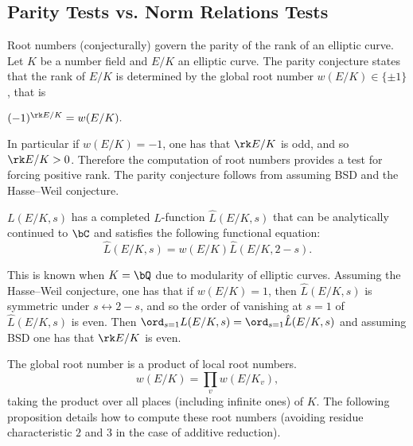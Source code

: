 \subsection{Parity Tests vs. Norm Relations Tests}\label{sec_tests}
Root numbers (conjecturally) govern the parity of the rank of an elliptic curve. Let $K$ be a number field and $E / K$ an elliptic curve. The parity conjecture states that the rank of $E / K$ is determined by the global root number $w(E / K) \in \{ \pm 1 \}$, that is

\begin{conj}\label{parity}
    $(-1)^{\rk E / K} = w(E / K).$
\end{conj}

In particular if $w(E / K) = -1$, one has that $\rk E / K$ is odd, and so $\rk E / K > 0$. Therefore the computation of root numbers provides a test for forcing positive rank. The parity conjecture follows from assuming BSD and the Hasse--Weil conjecture. 

\begin{conj}\label{conj_hasseweil}
    $L(E / K, s)$ has a completed $L$-function 
    $\hat{L}(E / K, s)$ that can be analytically continued to $\bC$ and satisfies the following functional equation:
    \[ \hat{L}(E / K, s) = w(E / K) \hat{L}(E / K, 2- s) .\]
\end{conj}

This is known when $K = \bQ$ due to modularity of elliptic curves. Assuming the Hasse--Weil conjecture, one has that if $w(E / K) = 1$, then $\hat{L}(E / K, s)$ is symmetric under $s \leftrightarrow 2 - s$, and so the order of vanishing at $s = 1$ of $\hat{L}(E / K, s)$ is even. Then $\ord_{s = 1} L(E / K, s) = \ord_{s = 1}\hat{L}(E / K, s)$ and assuming BSD one has that $\rk E / K$ is even. 

The global root number is a product of local root numbers. 
\[ w(E / K) = \prod_v w(E / K_v), \]
taking the product over all places (including infinite ones) of $K$. 
The following proposition details how to compute these root numbers (avoiding residue characteristic $2$ and $3$ in the case of additive reduction). 

